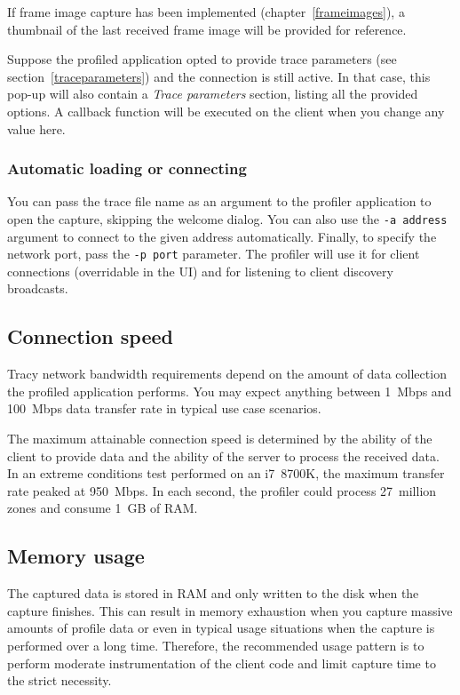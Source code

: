 \documentclass[hidelinks,titlepage,a4paper,twoside]{article}
\begin{document}
If frame image capture has been implemented (chapter~\ref{frameimages}), a thumbnail of the last received frame image will be provided for reference.

Suppose the profiled application opted to provide trace parameters (see section~\ref{traceparameters}) and the connection is still active. In that case, this pop-up will also contain a \emph{Trace parameters} section, listing all the provided options. A callback function will be executed on the client when you change any value here.

\subsubsection{Automatic loading or connecting}

You can pass the trace file name as an argument to the profiler application to open the capture, skipping the welcome dialog. You can also use the \texttt{-a address} argument to connect to the given address automatically. Finally, to specify the network port, pass the \texttt{-p port} parameter. The profiler will use it for client connections (overridable in the UI) and for listening to client discovery broadcasts.

\subsection{Connection speed}

Tracy network bandwidth requirements depend on the amount of data collection the profiled application performs. You may expect anything between 1~Mbps and 100~Mbps data transfer rate in typical use case scenarios.

The maximum attainable connection speed is determined by the ability of the client to provide data and the ability of the server to process the received data. In an extreme conditions test performed on an i7~8700K, the maximum transfer rate peaked at 950~Mbps. In each second, the profiler could process 27~million zones and consume 1~GB of RAM.

\subsection{Memory usage}
\label{memoryusage}

The captured data is stored in RAM and only written to the disk when the capture finishes. This can result in memory exhaustion when you capture massive amounts of profile data or even in typical usage situations when the capture is performed over a long time. Therefore, the recommended usage pattern is to perform moderate instrumentation of the client code and limit capture time to the strict necessity.
\end{document}
